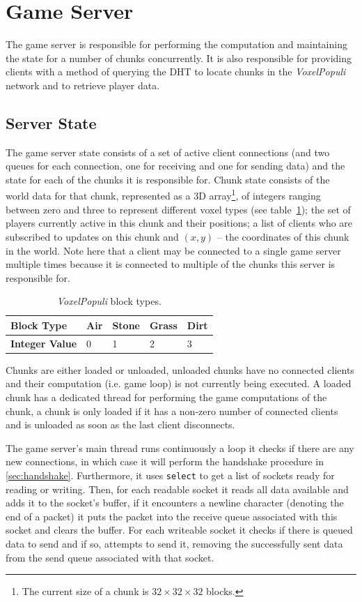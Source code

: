 \documentclass[12pt,notitlepage,a4paper]{report}
\newcommand{\voxpop}{\emph{VoxelPopuli}}
\begin{document}
	\section{Game Server}
	The game server is responsible for performing the computation and maintaining the state for a number of chunks concurrently. It is also responsible for providing clients with a method of querying the DHT to locate chunks in the \voxpop{} network and to retrieve player data.
	
	\subsection{Server State}
	The game server state consists of a set of active client connections (and two queues for each connection, one for receiving and one for sending data) and the state for each of the chunks it is responsible for. Chunk state consists of the world data for that chunk, represented as a 3D array\footnote{The current size of a chunk is $32\times32\times32$ blocks.},  of integers ranging between zero and three to represent different voxel types (see table~\ref{tab:blocks}); the set of players currently active in this chunk and their positions; a list of clients who are subscribed to updates on this chunk and $(x,y)$ -- the coordinates of this chunk in the world. Note here that a client may be connected to a single game server multiple times because it is connected to multiple of the chunks this server is responsible for.
	
	\begin{table}[!ht]
		\centering
		\begin{tabularx}{0.52\textwidth}{| l | l | l | l | X |}
			\hline
			\textbf{Block Type} & Air & Stone & Grass & Dirt \\
			\hline
			\textbf{Integer Value} & 0 & 1 & 2 & 3 \\
			\hline
		\end{tabularx}
		\caption{\voxpop{} block types.}
		\label{tab:blocks}
	\end{table}
	
	Chunks are either loaded or unloaded, unloaded chunks have no connected clients and their computation (i.e. game loop) is not currently being executed. A loaded chunk has a dedicated thread for performing the game computations of the chunk, a chunk is only loaded if it has a non-zero number of connected clients and is unloaded as soon as the last client disconnects.
	
	The game server's main thread runs continuously a loop it checks if there are any new connections, in which case it will perform the handshake procedure in \cref{sec:handshake}. Furthermore, it uses \texttt{select} to get a list of sockets ready for reading or writing. Then, for each readable socket it reads all data available and adds it to the socket's buffer, if it encounters a newline character (denoting the end of a packet) it puts the packet into the receive queue associated with this socket and clears the buffer. For each writeable socket it checks if there is queued data to send and if so, attempts to send it, removing the successfully sent data from the send queue associated with that socket.
	
\end{document}
